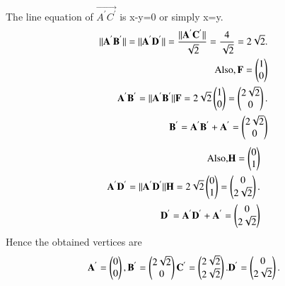 \documentclass[journal,12pt,twocolumn]{IEEEtran}
\begin{document}
The line equation of $\vec{A^{'}C^{'}}$ is x-y=0 or simply x=y.\\
\begin{align}
\begin{split}
\Vert\mathbf{A^{'}B^{'}}\Vert =\Vert\mathbf{A^{'}D^{'}}\Vert= \frac{\Vert\mathbf{A^{'}C^{'}}\Vert}{\sqrt{2}} = \frac{4}{\sqrt{2}}=2\sqrt{2}.\\
\text{Also}, \mathbf{F} = \begin{pmatrix}1\\0\end{pmatrix}\\
\mathbf{A^{'}B^{'}} = \Vert\mathbf{A^{'}B^{'}}\Vert \mathbf{F}=2\sqrt{2}\begin{pmatrix}1\\0\end{pmatrix}=\begin{pmatrix}2\sqrt{2}\\0\end{pmatrix}.\\
\mathbf{B^{'}} = \mathbf{A^{'}B^{'}}+\mathbf{A^{'}}=\begin{pmatrix}2\sqrt{2}\\0\end{pmatrix}\\
\end{split}
\end{align}
\begin{align}
\begin{split}
\text{Also,} \mathbf{H} = \begin{pmatrix}0\\1\end{pmatrix}\\
\mathbf{A^{'}D^{'}} = \Vert\mathbf{A^{'}D^{'}}\Vert \mathbf{H}=2\sqrt{2}\begin{pmatrix}0\\1\end{pmatrix}=\begin{pmatrix}0\\2\sqrt{2}\end{pmatrix}.\\
\mathbf{D^{'}} = \mathbf{A^{'}D^{'}}+\mathbf{A^{'}}=\begin{pmatrix}0\\2\sqrt{2}\end{pmatrix}\\
\end{split}
\end{align}
Hence the obtained vertices are 
\begin{align}
\begin{split}
\mathbf{A^{'}} = \begin{pmatrix}0 \\ 0\end{pmatrix},
\mathbf{B^{'}} = \begin{pmatrix}2\sqrt{2}\\0\end{pmatrix}
\mathbf{C^{'}} = \begin{pmatrix}2\sqrt{2}\\2\sqrt{2}\end{pmatrix}.
\mathbf{D^{'}} = \begin{pmatrix}0\\2\sqrt{2}\end{pmatrix}.
\end{split}
\end{align}
\end{document}
